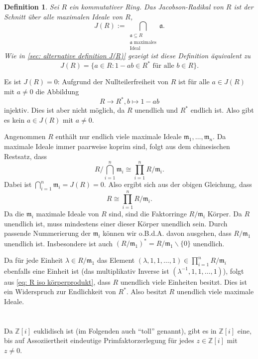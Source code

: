 \documentclass[a4paper,10pt]{article}
\newtheorem*{defi}{Definition}
\newcommand{\Z}{\mathbb{Z}}
\newcommand{\mf}[1]{\mathfrak{#1}}
\begin{document}
\section{}

\begin{defi}
 Sei $R$ ein kommutativer Ring. Das \emph{Jacobson-Radikal} von $R$ ist der Schnitt über alle maximalen Ideale von $R$,
 \[
  J(R)
  := \bigcap_{\substack{\mf{a} \subseteq R \\ \text{$\mf{a}$ maximales} \\ \text{Ideal}}} \mf{a}.
 \]
 Wie in \ref{sec: alternative definition J(R)} gezeigt ist diese Definition äquivalent zu
 \[
  J(R) = \{a \in R : 1-ab \in R^* \text{ für alle } b \in R\}.
 \]
\end{defi}

Es ist $J(R) = 0$: Aufgrund der Nullteilerfreiheit von $R$ ist für alle $a \in J(R)$ mit $a \neq 0$ die Abbildung
\[
 R \rightarrow R^*, b \mapsto 1-ab
\]
injektiv. Dies ist aber nicht möglich, da $R$ unendlich und $R^*$ endlich ist. Also gibt es kein $a \in J(R)$ mit $a \neq 0$.

Angenommen $R$ enthält nur endlich viele maximale Ideale $\mf{m}_1, \ldots, \mf{m}_n$. Da maximale Ideale immer paarweise koprim sind, folgt aus dem chinesischen Restsatz, dass
\[
 R/\bigcap_{i=1}^n \mf{m}_i \cong \prod_{i=1}^n R/\mf{m}_i.
\]
Dabei ist $\bigcap_{i=1}^n \mf{m}_i = J(R) = 0$. Also ergibt sich aus der obigen Gleichung, dass
\begin{equation}\label{eq: R iso körperprodukt}
 R \cong \prod_{i=1}^n R/\mf{m}_i.
\end{equation}
Da die $\mf{m}_i$ maximale Ideale von $R$ sind, sind die Faktorringe $R/\mf{m}_i$ Körper. Da $R$ unendlich ist, muss mindestens einer dieser Körper unendlich sein. Durch passende Nummerierung der $\mf{m}_i$ können wir o.B.d.A. davon ausgehen, dass $R/\mf{m}_1$ unendlich ist. Insbesondere ist auch $(R/\mf{m}_1)^* = R/\mf{m}_1 \smallsetminus \{0\}$ unendlich.

Da für jede Einheit $\lambda \in R/\mf{m}_1$ das Element $(\lambda, 1, 1, \ldots, 1) \in \prod_{i=1}^n R/\mf{m}_i$ ebenfalls eine Einheit ist (das multiplikativ Inverse ist $(\lambda^{-1}, 1, 1, \ldots, 1)$), folgt aus \eqref{eq: R iso körperprodukt}, dass $R$ unendlich viele Einheiten besitzt. Dies ist ein Widerspruch zur Endlichkeit von $R^*$. Also besitzt $R$ unendlich viele maximale Ideale.





\section{}
Da $\Z[i]$ euklidisch ist (im Folgenden auch "`toll"' genannt), gibt es in $\Z[i]$ eine, bis auf Assoziiertheit eindeutige Primfaktorzerlegung für jedes $z \in \Z[i]$ mit $z \neq 0$.
\end{document}
